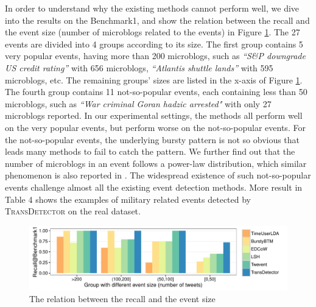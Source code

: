 \documentclass[runningheads,a4paper]{llncs}
\theoremstyle{exampstyle}
\begin{document}
In order to understand why the existing methods cannot perform well, we dive into the results on the Benchmark1, and show the relation between the recall and the event size (number of microblogs related to the events) in Figure \ref{fig:Benchmark1}. 
The 27 events are divided into 4 groups according to its size. 
The first group contains 5 very popular events, having more than 200 microblogs, such as \textit{``S\&P downgrade US credit rating''} with 656 microblogs, \textit{``Atlantis shuttle lands''} with 595 microblogs, etc.
The remaining groups' sizes are listed in the x-axis of Figure \ref{fig:Benchmark1}.
The fourth group contains 11 not-so-popular events, each containing less than 50 microblogs, such as \textit{``War criminal Goran hadzic arrested"} with only 27 microblogs reported.
In our experimental settings, the methods all perform well on the very popular events, but perform worse on the not-so-popular events.
For the not-so-popular events, the underlying bursty pattern is not so obvious that leads many methods to fail to catch the pattern.
We further find out that the number of microblogs in an event follows a power-law distribution, which similar phenomenon is also reported in \cite{Twevent2012}.
The widespread existence of such not-so-popular events challenge almost all the existing event detection methods.
More result in Table 4 shows the examples of military related events detected by \textsc{TransDetector} on the real dataset.

\begin{figure}[h]
	\setlength{\abovecaptionskip}{0.cm}
	\setlength{\belowcaptionskip}{0.cm}
        \centering
        \includegraphics[width=1.0\columnwidth]{img/barchartOnBenchmark1.pdf}
        \caption{The relation between the recall and the event size}
        \label{fig:Benchmark1}
\end{figure}
\end{document}
